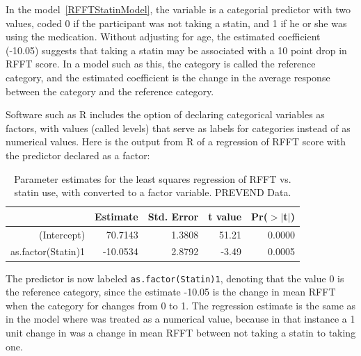 In the model~\ref{RFFTStatinModel}, the variable  is a categorial predictor with two values, coded 0 if the participant was not taking a statin, and 1 if he or she was using the medication.  Without adjusting for age, the estimated coefficient (-10.05) suggests that taking a statin may be associated with a 10 point drop in RFFT score.  In a model such as this, the category  is called the reference category, and the estimated coefficient is the change in the average response between the category  and the reference category.

Software such as \textsf{R} includes the option of declaring categorical variables as factors, with values (called levels) that serve as labels for categories instead of as numerical values.  Here is the output from \textsf{R} of a regression of RFFT score with the predictor  declared as a factor:
\begin{table}[ht]
\centering
\begin{tabular}{rrrrr}
  \hline
 & Estimate & Std. Error & t value & Pr($>$$|$t$|$) \\ 
  \hline
(Intercept) & 70.7143 & 1.3808 & 51.21 & 0.0000 \\ 
  as.factor(Statin)1 & -10.0534 & 2.8792 & -3.49 & 0.0005 \\ 
   \hline
\end{tabular}
\caption{Parameter estimates for 
       the least squares regression of RFFT vs. 
       statin use,  with  converted to a 
       factor variable.  PREVEND Data.} 
\end{table}

The predictor is now labeled \texttt{as.factor(Statin)1}, denoting that the value 0 is the reference category, since the estimate -10.05 is the change in mean RFFT when the category for  changes from 0 to 1.  The regression estimate is the same as in the model where  was treated as a numerical value, because in that instance a 1 unit change in  was a change in mean RFFT between not taking a statin to taking one.  

